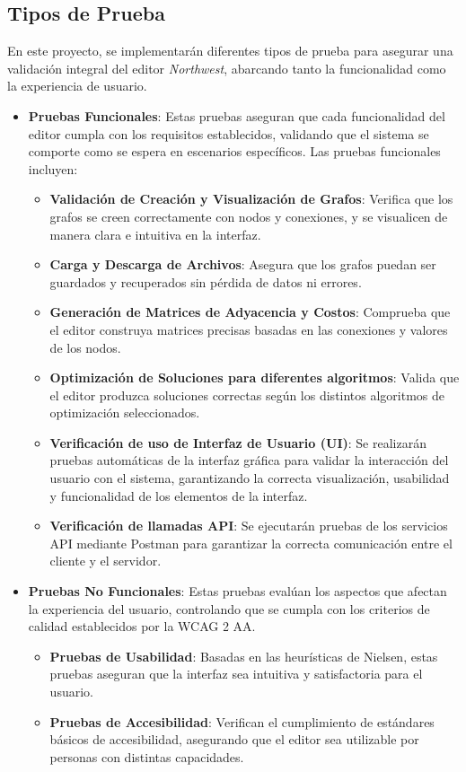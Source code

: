 \documentclass[stu, 12pt, letterpaper, donotrepeattitle, floatsintext, natbib]{apa7}
\begin{document}
\subsection{Tipos de Prueba}

\noindent En este proyecto, se implementarán diferentes tipos de prueba para asegurar una validación integral del editor \textit{Northwest}, abarcando tanto la funcionalidad como la experiencia de usuario.

\begin{itemize}
    \item \textbf{Pruebas Funcionales}: Estas pruebas aseguran que cada funcionalidad del editor cumpla con los requisitos establecidos, validando que el sistema se comporte como se espera en escenarios específicos. Las pruebas funcionales incluyen:
    \begin{itemize}
        \item \textbf{Validación de Creación y Visualización de Grafos}: Verifica que los grafos se creen correctamente con nodos y conexiones, y se visualicen de manera clara e intuitiva en la interfaz.
        \item \textbf{Carga y Descarga de Archivos}: Asegura que los grafos puedan ser guardados y recuperados sin pérdida de datos ni errores.
        \item \textbf{Generación de Matrices de Adyacencia y Costos}: Comprueba que el editor construya matrices precisas basadas en las conexiones y valores de los nodos.
        \item \textbf{Optimización de Soluciones para diferentes algoritmos}: Valida que el editor produzca soluciones correctas según los distintos algoritmos de optimización seleccionados.
        \item \textbf{Verificación de uso de Interfaz de Usuario (UI)}: Se realizarán pruebas automáticas de la interfaz gráfica para validar la interacción del usuario con el sistema, garantizando la correcta visualización, usabilidad y funcionalidad de los elementos de la interfaz.
        \item \textbf{Verificación de llamadas API}: Se ejecutarán pruebas de los servicios API mediante Postman para garantizar la correcta comunicación entre el cliente y el servidor.
    \end{itemize}

    \item \textbf{Pruebas No Funcionales}: Estas pruebas evalúan los aspectos que afectan la experiencia del usuario, controlando que se cumpla con los criterios de calidad establecidos por la WCAG 2 AA.    
    \begin{itemize}
        \item \textbf{Pruebas de Usabilidad}: Basadas en las heurísticas de Nielsen, estas pruebas aseguran que la interfaz sea intuitiva y satisfactoria para el usuario.
        \item \textbf{Pruebas de Accesibilidad}: Verifican el cumplimiento de estándares básicos de accesibilidad, asegurando que el editor sea utilizable por personas con distintas capacidades.
    \end{itemize}
\end{itemize}
\end{document}
